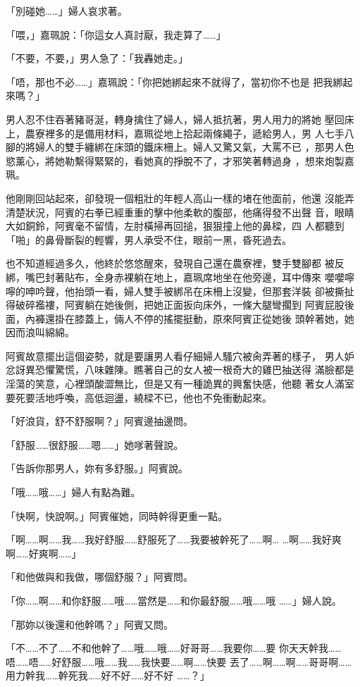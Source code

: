 「別碰她……」婦人哀求著。

「喂，」嘉珮說：「你這女人真討厭，我走算了……」

「不要，不要，」男人急了：「我轟她走。」

「唔，那也不必……」嘉珮說：「你把她綁起來不就得了，當初你不也是
把我綁起來嗎？」

男人忍不住吞著豬哥涎，轉身擒住了婦人，婦人抵抗著，男人用力的將她
壓回床上，農寮裡多的是備用材料，嘉珮從地上拾起兩條繩子，遞給男人，男
人七手八腳的將婦人的雙手纏綁在床頭的鐵床柵上。婦人又驚又氣，大罵不已
，那男人色慾薰心，將她勒繫得緊緊的，看她真的掙脫不了，才邪笑著轉過身
，想來炮製嘉珮。

他剛剛回站起來，卻發現一個粗壯的年輕人高山一樣的堵在他面前，他還
沒能弄清楚狀況，阿賓的右拳已經重重的擊中他柔軟的腹部，他痛得發不出聲
音，眼睛大如銅鈴，阿賓毫不留情，左肘橫掃再回搥，狠狠撞上他的鼻樑，四
人都聽到「啪」的鼻骨斷裂的輕響，男人承受不住，眼前一黑，昏死過去。

也不知道經過多久，他終於悠悠醒來，發現自己還在農寮裡，雙手雙腳都
被反綁，嘴巴封著貼布，全身赤裸躺在地上，嘉珮席地坐在他旁邊，耳中傳來
嚶嚶嚀嚀的呻吟聲，他抬頭一看，婦人雙手被綁吊在床柵上沒變，但那套洋裝
卻被撕扯得破碎襤褸，阿賓躺在她後側，把她正面扳向床外，一條大腿彎擱到
阿賓屁股後面，內褲還掛在膝蓋上，倆人不停的搖擺挺動，原來阿賓正從她後
頭幹著她，她因而浪叫綿綿。

阿賓故意擺出這個姿勢，就是要讓男人看仔細婦人騷穴被肏弄著的樣子，
男人妒忿訝異恐懼驚慌，八味雜陳。瞧著自己的女人被一根奇大的雞巴抽送得
滿臉都是淫蕩的笑意，心裡頭酸澀無比，但是又有一種詭異的興奮快感，他聽
著女人滿室要死要活地呼喚，高低迴盪，繞樑不已，他也不免衝動起來。

「好浪貨，舒不舒服啊？」阿賓邊抽邊問。

「舒服……很舒服……嗯……」她嗲著聲說。

「告訴你那男人，妳有多舒服。」阿賓說。

「哦……哦……」婦人有點為難。

「快啊，快說啊。」阿賓催她，同時幹得更重一點。

「啊……啊……我……我好舒服……舒服死了……我要被幹死了……啊…
…啊……我好爽啊……好爽啊……」

「和他做與和我做，哪個舒服？」阿賓問。

「你……啊……和你舒服……哦……當然是……和你最舒服……哦……哦
……」婦人說。

「那妳以後還和他幹嗎？」阿賓又問。

「不……不了……不和他幹了……哦……哦……好哥哥……我要你……要
你天天幹我……唔……唔……好舒服……哦……我……我快要……啊……快要
丟了……啊……啊……哥哥啊……用力幹我……幹死我……好不好……好不好
……？」

